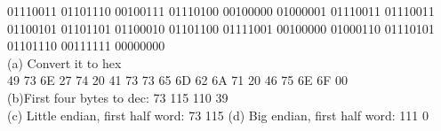 \documentclass{article}
\begin{document}
 01110011 01101110 00100111 01110100 00100000 01000001
01110011 01110011 01100101 01101101 01100010 01101100 01111001
00100000 01000110 01110101 01101110 00111111 00000000\\

\noindent(a) Convert it to hex\\
49 73 6E 27 74 20 41 73 73 65 6D 62 6A 71 20 46 75 6E 6F 00\\
(b)First four bytes to dec: 73 115 110 39\\
(c) Little endian, first half word: 73 115 
(d) Big endian, first half word: 111 0
\end{document}
